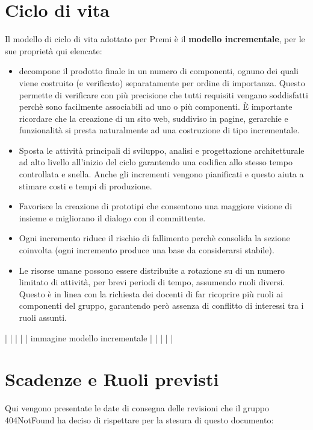 \section{Ciclo di vita}
Il modello di ciclo di vita adottato per Premi è il \textbf{modello incrementale}, per le sue proprietà qui elencate:

\begin{itemize}
	\item decompone il prodotto finale in un numero di componenti, ognuno dei quali viene costruito (e verificato) separatamente per ordine di importanza. Questo permette di verificare con più precisione che tutti requisiti vengano soddisfatti perchè sono facilmente associabili ad uno o più componenti. È importante ricordare che la creazione di un sito web, suddiviso in pagine, gerarchie e funzionalità si presta naturalmente ad una costruzione di tipo incrementale.
	\item Sposta le attività principali di sviluppo, analisi e progettazione architetturale ad alto livello all'inizio del ciclo garantendo una codifica allo stesso tempo controllata e snella. Anche gli incrementi vengono pianificati e questo aiuta a stimare costi e tempi di produzione.
	\item Favorisce la creazione di prototipi che consentono una maggiore visione di insieme e migliorano il dialogo con il committente.
	\item Ogni incremento riduce il rischio di fallimento perchè consolida la sezione coinvolta (ogni incremento produce una base da considerarsi stabile).
	\item Le risorse umane possono essere distribuite a rotazione su di un numero limitato di attività, per brevi periodi di tempo, assumendo ruoli diversi. Questo è in linea con la richiesta dei docenti di far ricoprire più ruoli ai componenti del gruppo, garantendo però assenza di conflitto di interessi tra i ruoli assunti.
\end{itemize}	
	
|
|
|
|
|            immagine modello incrementale
|
|
|
|
|


\section{Scadenze e Ruoli previsti}
Qui vengono presentate le date di consegna delle revisioni che il gruppo 404NotFound ha deciso di rispettare per la stesura di questo documento:


